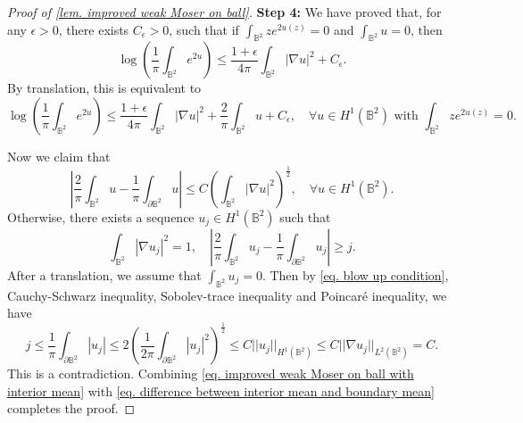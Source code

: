 \documentclass[10pt,a4paper]{amsart}
\begin{document}
\begin{proof}[Proof of \cref{lem. improved weak Moser on ball}]
        {\bf Step 4:} We have proved that, for any $\epsilon>0$, there exists $C_\epsilon>0$, such that if $\int_{\mathbb{B}^2}ze^{2u(z)}=0$ and
        $\int_{\mathbb{B}^2}u=0$, then  
        \[
        \log\left(
        \frac{1}{\pi}
        \int_{\mathbb{B}^2}e^{2u}
        \right)
        \leq \frac{1+\epsilon}{4\pi}
        \int_{\mathbb{B}^2}|\nabla u|^2
        +C_\epsilon.
        \]
        By translation, this is equivalent to
        \begin{equation}
        \label{eq. improved weak Moser on ball with interior mean}
            \log\left(
        \frac{1}{\pi}
        \int_{\mathbb{B}^2}e^{2u}
        \right)
        \leq \frac{1+\epsilon}{4\pi}
        \int_{\mathbb{B}^2}|\nabla u|^2
        +\frac{2}{\pi}\int_{\mathbb{B}^2}u
        +C_\epsilon,\quad 
        \forall u\in H^1(\mathbb{B}^2)
        \text{ with } 
        \int_{\mathbb{B}^2}ze^{2u(z)}=0.
        \end{equation}
        
        Now we claim that
        \begin{equation}
        \label{eq. difference between interior mean and boundary mean}
            \left|
        \frac{2}{\pi}\int_{\mathbb{B}^2}u
        -\frac{1}{\pi}
        \int_{\partial\mathbb{B}^2}u
        \right|
        \leq C
        \left(\int_{\mathbb{B}^2}|\nabla u|^2
        \right)^{\frac{1}{2}},\quad 
        \forall u\in H^1(\mathbb{B}^2).
        \end{equation}
        Otherwise, there exists a sequence $u_j\in H^1(\mathbb{B}^2)$ such that
        \begin{equation}
        \label{eq. blow up condition}
            \int_{\mathbb{B}^2}|\nabla u_j|^2=1,\quad 
        \left|
        \frac{2}{\pi}\int_{\mathbb{B}^2}u_j
        -\frac{1}{\pi}
        \int_{\partial\mathbb{B}^2}u_j
        \right|
        \geq j.
        \end{equation}
        After a translation, we assume that $\int_{\mathbb{B}^2}u_j=0$. Then by \cref{eq. blow up condition}, Cauchy-Schwarz inequality, Sobolev-trace inequality and Poincar\'e inequality, we have
        \[
        j
        \leq \frac{1}{\pi}\int_{\partial \mathbb{B}^2}
        |u_j|
        \leq 2\left(
        \frac{1}{2\pi}
        \int_{\partial\mathbb{B}^2}|u_j|^2
        \right)^{\frac{1}{2}}
        \leq C||u_j||_{H^1(\mathbb{B}^2)}
        \leq C||\nabla u_j||_{L^2(\mathbb{B}^2)}
        =C.
        \]
        This is a contradiction. Combining \cref{eq. improved weak Moser on ball with interior mean} with \cref{eq. difference between interior mean and boundary mean} completes the proof.
    \end{proof}
\end{document}
